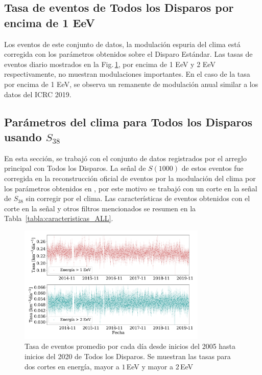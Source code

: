 \subsection{Tasa de eventos de Todos los Disparos por encima de 1 EeV}

Los eventos de este conjunto de datos, la modulación espuria del clima está corregida con los parámetros obtenidos sobre el Disparo Estándar. Las tasas de eventos diario mostrados en la Fig.\,\ref{fig:rate_ALL}, por encima de 1 EeV y 2 EeV respectivamente, no muestran modulaciones importantes. En el caso de la tasa por encima de 1 EeV, se observa un remanente de modulación anual similar a los datos del ICRC 2019. 





\subsection{Parámetros del clima para Todos los Disparos usando $S_{38}$}


En esta sección, se trabajó con el conjunto de datos registrados por el arreglo principal con Todos los Disparos. La señal de $S(1000)$ de estos eventos fue corregida en la reconstrucción oficial de eventos por la modulación del clima por los parámetros obtenidos en \cite{aab2017impact}, por este motivo se trabajó con un corte en la señal de $S_{38}$ sin corregir por el clima. Las características de eventos obtenidos con el corte en la señal y otros filtros mencionados se resumen en la Tabla~\ref{tabla:caracteristicas_ALL}. 

\begin{figure}[H]
  \centering
  \includegraphics[width=0.8\textwidth]{../04_Clima/Graphs/rate_dayly/AllTriggers_1EeV_2EeV_rate.pdf}
  \caption{Tasa de eventos promedio por cada día desde inicios del 2005 hasta inicios del 2020 de Todos los Disparos. Se muestran las tasas para dos cortes en energía, mayor a $1\,$EeV y mayor a $2\,$EeV}\label{fig:rate_ALL}
\end{figure}

